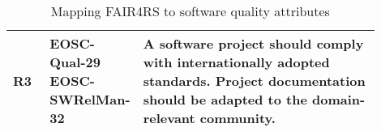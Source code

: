 \begin{table}[]
\begin{tabular}{|p{0.1\linewidth}|p{0.15\linewidth}|p{0.65\linewidth}|}
    R3 & \makecell{EOSC-Qual-29 \\ EOSC-SWRelMan-32} &
    A software project should comply with internationally adopted standards. Project documentation should be adapted to the domain-relevant community. \\ \hline

  \end{tabular}
\caption{Mapping FAIR4RS to software quality attributes}
\label{tab:cfs}
\end{table}



















